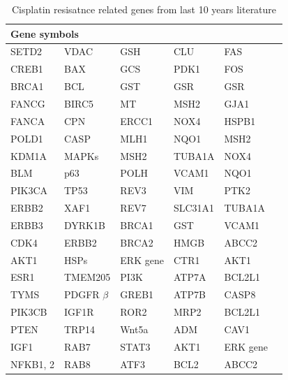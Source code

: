  \begin{table}[htbp]
   \centering
   \caption{Cisplatin resisatnce related genes from last 10 years literature}
     \begin{tabular}{|l|l|l|l|l|r}
     \hline
     \multicolumn{5}{|l|}{Gene symbols} \\
     \hline
     SETD2 & VDAC & GSH & CLU  & FAS \\
     CREB1 & BAX & GCS & PDK1 & FOS \\
     BRCA1 & BCL & GST & GSR  & GSR \\
     FANCG & BIRC5  & MT & MSH2  & GJA1 \\
     FANCA & CPN & ERCC1 & NOX4  & HSPB1 \\
     POLD1 & CASP & MLH1 & NQO1 & MSH2 \\
     KDM1A & MAPKs & MSH2 & TUBA1A  & NOX4 \\
     BLM & p63 & POLH & VCAM1  & NQO1 \\
     PIK3CA & TP53 & REV3 & VIM  & PTK2 \\
     ERBB2 & XAF1 & REV7 & SLC31A1 & TUBA1A \\
     ERBB3 & DYRK1B & BRCA1 & GST & VCAM1 \\
     CDK4 & ERBB2  & BRCA2 & HMGB & ABCC2  \\
     AKT1 & HSPs & ERK gene & CTR1 & AKT1  \\
     ESR1 & TMEM205 & PI3K & ATP7A & BCL2L1  \\
     TYMS & PDGFR $\beta$ & GREB1 & ATP7B & CASP8  \\
     PIK3CB & IGF1R & ROR2 & MRP2 & BCL2L1 \\
     PTEN & TRP14 & Wnt5a & ADM & CAV1 \\
     IGF1 & RAB7 & STAT3 & AKT1 & ERK gene \\
     NFKB1, 2 & RAB8 & ATF3 & BCL2 & ABCC2 \\
     \hline
     \end{tabular}%
   \label{tab:Cisplatinrelatedgenes}%
 \end{table}%


